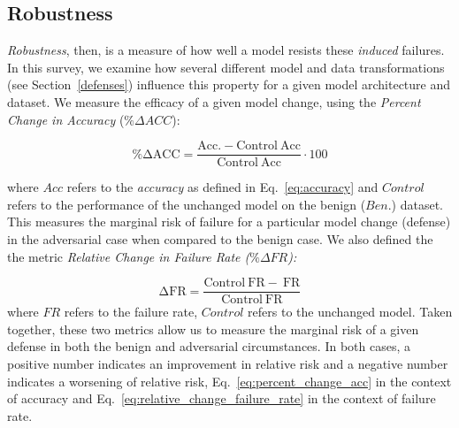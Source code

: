\documentclass[lettersize,journal]{IEEEtran}
\newcommand{\ie}{\textit{i.e.}\xspace}
\newcommand{\probP}{\text{I\kern-0.15em P}}
\begin{document}
\subsection{Robustness}
\textit{Robustness}, then, is a measure of how well a model resists these \textit{induced} failures. In this survey, we examine how several different model and data transformations (see Section~\ref{defenses}) influence this property for a given model architecture and dataset. We measure the efficacy of a given model change, using the \textit{Percent Change in Accuracy} ($\%\Delta ACC$):

\begin{equation}
    \label{eq:percent_change_acc}
    \mathrm{\%\Delta ACC =
        \frac{Acc.-Control~Acc}{Control~Acc}} \cdot 100
\end{equation}

where $Acc$ refers to the \textit{accuracy} as defined in Eq.~\ref{eq:accuracy} and $Control$ refers to the performance of the unchanged model on the benign ($Ben.$) dataset. This measures the marginal risk of failure for a particular model change (defense) in the adversarial case when compared to the benign case. We also defined the the metric \textit{Relative Change in Failure Rate ($\% \Delta FR $):}

\begin{equation}
\label{eq:relative_change_failure_rate}
\mathrm{\Delta FR} =
    \frac{\mathrm{Control~FR-~FR}}{\mathrm{Control~FR}}
\end{equation}
where $FR$ refers to the failure rate, $Control$ refers to the unchanged model. Taken together, these two metrics allow us to measure the marginal risk of a given defense in both the benign and adversarial circumstances. In both cases, a positive number indicates an improvement in relative risk and a negative number indicates a worsening of relative risk, Eq.~\ref{eq:percent_change_acc} in the context of accuracy and Eq.~\ref{eq:relative_change_failure_rate} in the context of failure rate.

\end{document}
